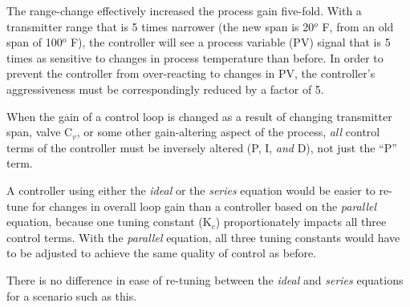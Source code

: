 
The range-change effectively increased the process gain five-fold.  With a transmitter range that is 5 times narrower (the new span is 20$^{o}$ F, from an old span of 100$^{o}$ F), the controller will see a process variable (PV) signal that is 5 times as sensitive to changes in process temperature than before.  In order to prevent the controller from over-reacting to changes in PV, the controller's aggressiveness must be correspondingly reduced by a factor of 5.

\vskip 10pt

When the gain of a control loop is changed as a result of changing transmitter span, valve C$_{v}$, or some other gain-altering aspect of the process, {\it all} control terms of the controller must be inversely altered (P, I, {\it and} D), not just the ``P'' term.  

A controller using either the {\it ideal} or the {\it series} equation would be easier to re-tune for changes in overall loop gain than a controller based on the {\it parallel} equation, because one tuning constant (K$_{c}$) proportionately impacts all three control terms.  With the {\it parallel} equation, all three tuning constants would have to be adjusted to achieve the same quality of control as before.  

There is no difference in ease of re-tuning between the {\it ideal} and {\it series} equations for a scenario such as this.




